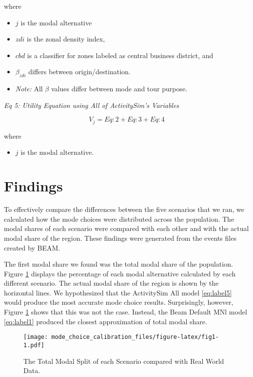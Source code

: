 \documentclass[3p, authoryear]{elsarticle} %
\providecommand{\tightlist}{%
  \setlength{\itemsep}{0pt}\setlength{\parskip}{0pt}}
\begin{document}
where

\begin{itemize}
\tightlist
\item
  \(j\) is the modal alternative
\item
  \(zdi\) is the zonal density index,
\item
  \(cbd\) is a classifier for zones labeled as central business district, and
\item
  \(\beta_{zdi}\) differs between origin/destination.
\item
  \emph{Note:} All \(\beta\) values differ between mode and tour purpose.
\end{itemize}

\emph{Eq 5: Utility Equation using All of ActivitySim's Variables}

\begin{equation}  
  V_j = Eq:2 + Eq:3 + Eq:4 \label{eq:label5}
\end{equation}

where

\begin{itemize}
\tightlist
\item
  \(j\) is the modal alternative.
\end{itemize}

\hypertarget{findings}{%
\section{Findings}\label{findings}}

To effectively compare the differences between the five scenarios that we ran, we calculated how the mode choices were distributed across the population. The modal shares of each scenario were compared with each other and with the actual modal share of the region. These findings were generated from the events files created by BEAM.

The first modal share we found was the total modal share of the population. Figure \ref{fig:fig1} displays the percentage of each modal alternative calculated by each different scenario. The actual modal share of the region is shown by the horizontal lines. We hypothesized that the ActivitySim All model \eqref{eq:label5} would produce the most accurate mode choice results. Surprisingly, however, Figure \ref{fig:fig1} shows that this was not the case. Instead, the Beam Default MNl model \eqref{eq:label1} produced the closest approximation of total modal share.

\begin{figure}
\centering
\texttt{[image: mode\_choice\_calibration\_files/figure-latex/fig1-1.pdf]}
\caption{\label{fig:fig1}The Total Modal Split of each Scenario compared with Real World Data.}
\end{figure}
\end{document}

